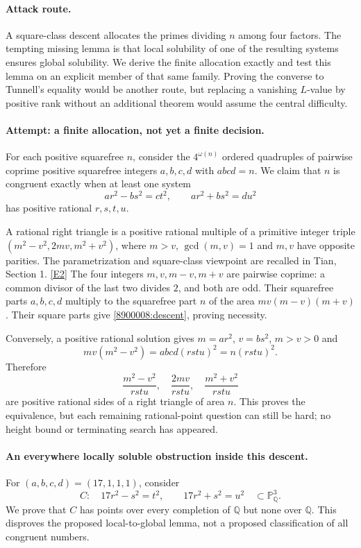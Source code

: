 \documentclass[11pt,a4paper]{article}
\newcommand{\Q}{\mathbb{Q}}
\newcommand{\PP}{\mathbb P}
\newcommand{\eref}[2]{\hyperlink{extra:#1:#2}{[E#2]}}
\numberwithin{equation}{section}
\begin{document}
\paragraph{Attack route.}
A square-class descent allocates the primes dividing $n$ among four factors.
The tempting missing lemma is that local solubility of one of the resulting
systems ensures global solubility. We derive the finite allocation exactly
and test this lemma on an explicit member of that same family. Proving the
converse to Tunnell's equality would be another route, but replacing a
vanishing $L$-value by positive rank without an additional theorem would
assume the central difficulty.

\paragraph{Attempt: a finite allocation, not yet a finite decision.}
For each positive squarefree $n$, consider the $4^{\omega(n)}$ ordered
quadruples of pairwise coprime positive squarefree integers $a,b,c,d$ with
$abcd=n$. We claim that $n$ is congruent exactly when at least one system
\begin{equation}\label{8900008:descent}
 ar^2-bs^2=ct^2,\qquad ar^2+bs^2=du^2
\end{equation}
has positive rational $r,s,t,u$.

A rational right triangle is a positive rational multiple of a primitive
integer triple $(m^2-v^2,2mv,m^2+v^2)$, where $m>v$, $\gcd(m,v)=1$ and
$m,v$ have opposite parities. The parametrization and square-class viewpoint
are recalled in Tian, Section 1. \eref{8900008}{2} The four integers
$m,v,m-v,m+v$ are pairwise coprime: a common divisor of the last two divides
$2$, and both are odd. Their squarefree parts $a,b,c,d$ multiply to the
squarefree part $n$ of the area $mv(m-v)(m+v)$. Their square parts give
\eqref{8900008:descent}, proving necessity.

Conversely, a positive rational solution gives $m=ar^2$, $v=bs^2$, $m>v>0$
and
\[
 mv(m^2-v^2)=abcd(rstu)^2=n(rstu)^2.
\]
Therefore
\begin{equation}\label{8900008:triangle}
 \frac{m^2-v^2}{rstu},\quad \frac{2mv}{rstu},\quad
 \frac{m^2+v^2}{rstu}
\end{equation}
are positive rational sides of a right triangle of area $n$. This proves
the equivalence, but each remaining rational-point question can still be
hard; no height bound or terminating search has appeared.

\paragraph{An everywhere locally soluble obstruction inside this descent.}
For $(a,b,c,d)=(17,1,1,1)$, consider
\begin{equation}\label{8900008:C}
 C:\quad 17r^2-s^2=t^2,\qquad17r^2+s^2=u^2
 \quad\subset\PP^3_{\Q}.
\end{equation}
We prove that $C$ has points over every completion of $\Q$ but none over
$\Q$. This disproves the proposed local-to-global lemma, not a proposed
classification of all congruent numbers.
\end{document}
